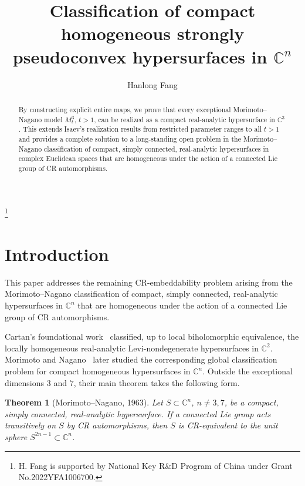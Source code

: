 \documentclass[11pt,a4paper,reqno]{amsart}
\title[Classification of homogeneous hypersurfaces in $\mathbb C^n$]
{\bf Classification of compact homogeneous strongly pseudoconvex hypersurfaces in $\mathbb C^n$}
\author{Hanlong Fang}
\date{}
\newtheorem{theorem}{Theorem}[section]
\newcommand\blfootnote[1]{%
  \begingroup
  \renewcommand\thefootnote{}\footnote{#1}%
  \addtocounter{footnote}{-1}%
  \endgroup
}
\begin{document}
\blfootnote{H. Fang is supported by National Key R\&D Program of China under Grant No.2022YFA1006700. }


\begin{abstract} 
By constructing explicit entire maps, we prove that every exceptional Morimoto--Nagano model $M_t^3$, $t>1$, can be realized as a compact real-analytic hypersurface in $\mathbb C^3$. This extends Isaev's realization results from restricted parameter ranges to all $t>1$ and provides a complete solution to a long-standing open problem in the Morimoto--Nagano classification of compact, simply connected, real-analytic hypersurfaces in complex Euclidean spaces that are homogeneous under the action of a connected Lie group of CR automorphisms.
\end{abstract}

\maketitle

\section{Introduction} 

This paper addresses the remaining CR-embeddability problem arising from the Morimoto--Nagano classification of compact, simply connected, real-analytic hypersurfaces in 
$\mathbb C^n$ that are homogeneous under the action of a connected Lie group of CR automorphisms.

  

Cartan's foundational work~\cite{Cartan1933,Cartan1932} classified, up to local biholomorphic equivalence, the locally homogeneous real-analytic Levi-nondegenerate hypersurfaces in $\mathbb C^2$. Morimoto and Nagano~\cite{MorimotoNagano1963} later studied the corresponding global classification problem for compact homogeneous hypersurfaces in $\mathbb C^n$. Outside the exceptional dimensions $3$ and $7$, their main theorem takes the following form.


\begin{theorem}[Morimoto--Nagano, 1963]
Let $S\subset\mathbb C^n$, $n\neq3,7$, be a compact, simply connected, real-analytic hypersurface.
If a connected Lie group acts transitively on \(S\) by CR automorphisms, then \(S\) is CR-equivalent to the unit sphere
\(S^{2n-1}\subset\mathbb{C}^n\).
\end{theorem}
\end{document}
